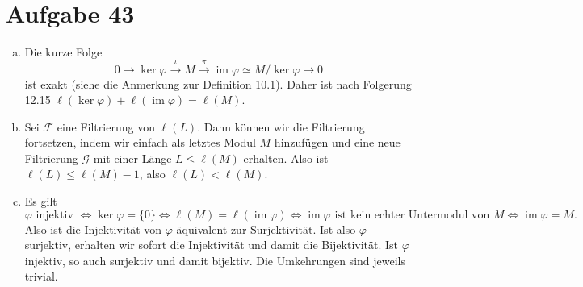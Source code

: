 \documentclass{article}
\theoremstyle{definition}
\newcommand{\equals}{\Longleftrightarrow}
\newcommand{\im}{\operatorname{im}}
\begin{document}
\section*{Aufgabe 43}
\begin{enumerate}[(a)]
    \item Die kurze Folge 
    \[
        0 \to \ker \varphi \xrightarrow{\iota} M \xrightarrow{\pi} \im \varphi \simeq M/\ker \varphi \to 0
    \]
    ist exakt (siehe die Anmerkung zur Definition 10.1). Daher ist nach Folgerung 12.15 $\ell(\ker \varphi) + \ell(\im \varphi) = \ell(M)$.
    \item Sei $\mathcal{F}$ eine Filtrierung von $\ell(L)$. Dann können wir die Filtrierung fortsetzen, indem wir einfach als letztes Modul $M$ hinzufügen und eine neue Filtrierung $\mathcal{G}$ mit einer Länge $L \leq \ell(M)$ erhalten. Also ist $\ell(L) \leq \ell(M) - 1$, also $\ell(L) < \ell(M)$.
    \item Es gilt
    \[
        \varphi \text{ injektiv } \equals \ker \varphi = \{0\} \equals \ell(M) = \ell(\im \varphi) \equals \im \varphi \text{ ist kein echter Untermodul von } M \equals \im \varphi = M.
    \]
    Also ist die Injektivität von $\varphi$ äquivalent zur Surjektivität. Ist also $\varphi$ surjektiv, erhalten wir sofort die Injektivität und damit die Bijektivität. Ist $\varphi$ injektiv, so auch surjektiv und damit bijektiv. Die Umkehrungen sind jeweils trivial.
\end{enumerate}
\end{document}
